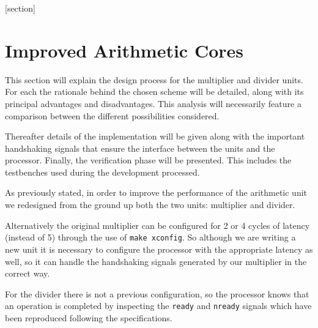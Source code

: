 \newcommand{\ov}[1]{\overline{#1}}
[section]
\newcommand{\unaryminus}{\scalebox{0.5}[1.0]{\( - \)}}
\newcommand{\AND}{\texttt{AND}\xspace}
\newcommand{\RST}{\texttt{RST}\xspace}
\newcommand{\CLK}{\texttt{CLK}\xspace}
\newcommand{\HOLDN}{\texttt{HOLDN}\xspace}
\newcommand{\MULI}{\texttt{MULI}\xspace}
\newcommand{\MULO}{\texttt{MULO}\xspace}
\newcommand{\infer}{\texttt{infer}\xspace}
\newcommand{\multype}{\texttt{multype}\xspace}
\newcommand{\pipe}{\texttt{pipe}\xspace}
\newcommand{\mac}{\texttt{mac}\xspace}
\newcommand{\ready}{\texttt{ready}\xspace}
\newcommand{\start}{\texttt{start}\xspace}
\newcommand{\holdn}{\texttt{holdn}\xspace}
\newcommand{\nready}{\texttt{nready}\xspace}
\newcommand{\STDV}{\texttt{STD\_LOGIC\_VECTOR}\xspace}



\section{Improved Arithmetic Cores}
\label{sec:arth}

This section will explain the design process for the multiplier and divider units.
For each the rationale behind the chosen scheme will be detailed, along with its principal advantages and disadvantages.
This analysis will necessarily feature a comparison between the different possibilities considered.

Thereafter details of the implementation will be given along with the important handshaking signals that ensure the interface between the units and the processor. Finally, the verification phase will be presented. This includes the testbenches used during the development processed.

As previously stated, in order to improve the performance of the arithmetic unit we redesigned from the ground up both the
two units: multiplier and divider.

Alternatively the original multiplier can be configured for 2 or 4 cycles of latency (instead of 5) through the use of \texttt{make xconfig}.
So although we are writing a new unit it is necessary to configure the
processor with the appropriate latency as well, so it can handle the
handshaking signals generated by our multiplier in the correct way.

For the divider there is not a previous configuration, so the processor knows that an operation is
completed by inspecting the \texttt{ready} and \texttt{nready} signals which have been reproduced following the
specifications.


